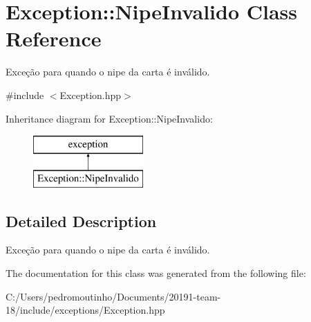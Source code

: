 \hypertarget{class_exception_1_1_nipe_invalido}{}\section{Exception\+::Nipe\+Invalido Class Reference}
\label{class_exception_1_1_nipe_invalido}


Exceção para quando o nipe da carta é inválido.  




{\ttfamily \#include $<$Exception.\+hpp$>$}

Inheritance diagram for Exception\+::Nipe\+Invalido\+:\begin{figure}[H]
\begin{center}
\leavevmode
\includegraphics[height=2.000000cm]{class_exception_1_1_nipe_invalido}
\end{center}
\end{figure}


\subsection{Detailed Description}
Exceção para quando o nipe da carta é inválido. 



The documentation for this class was generated from the following file\+:\begin{DoxyCompactItemize}
\item 
C\+:/\+Users/pedromoutinho/\+Documents/20191-\/team-\/18/include/exceptions/Exception.\+hpp\end{DoxyCompactItemize}
